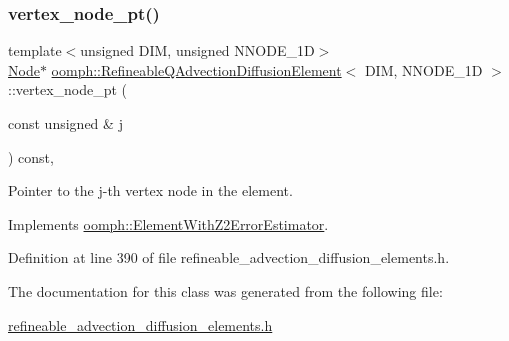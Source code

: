 \subsubsection{\texorpdfstring{vertex\+\_\+node\+\_\+pt()}{vertex\_node\_pt()}}
{\footnotesize\ttfamily template$<$unsigned D\+IM, unsigned N\+N\+O\+D\+E\+\_\+1D$>$ \\
\hyperlink{classoomph_1_1Node}{Node}$\ast$ \hyperlink{classoomph_1_1RefineableQAdvectionDiffusionElement}{oomph\+::\+Refineable\+Q\+Advection\+Diffusion\+Element}$<$ D\+IM, N\+N\+O\+D\+E\+\_\+1D $>$\+::vertex\+\_\+node\+\_\+pt (\begin{DoxyParamCaption}\item[{const unsigned \&}]{j }\end{DoxyParamCaption}) const\hspace{0.3cm}{\ttfamily [inline]}, {\ttfamily [virtual]}}



Pointer to the j-\/th vertex node in the element. 



Implements \hyperlink{classoomph_1_1ElementWithZ2ErrorEstimator_a0eedccc33519f852c5dc2055ddf2774b}{oomph\+::\+Element\+With\+Z2\+Error\+Estimator}.



Definition at line 390 of file refineable\+\_\+advection\+\_\+diffusion\+\_\+elements.\+h.



The documentation for this class was generated from the following file\+:\begin{DoxyCompactItemize}
\item 
\hyperlink{refineable__advection__diffusion__elements_8h}{refineable\+\_\+advection\+\_\+diffusion\+\_\+elements.\+h}\end{DoxyCompactItemize}
